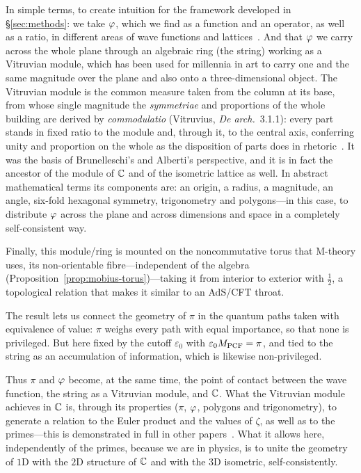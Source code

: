 In simple terms, to create intuition for the framework developed in \S\ref{sec:methods}: we take $\varphi$, which we find as a function and an operator, as well as a ratio, in different areas of wave functions and lattices~\cite{Pletser2018,Jagannathan2021,Jedrkiewicz2018,Sonnino2024}. And that $\varphi$ we carry across the whole plane through an algebraic ring (the string) working as a Vitruvian module, which has been used for millennia in art to carry one and the same magnitude over the plane and also onto a three-dimensional object. The Vitruvian module is the common measure taken from the column at its base, from whose single magnitude the \emph{symmetriae} and proportions of the whole building are derived by \emph{commodulatio} (Vitruvius, \emph{De arch.}~3.1.1): every part stands in fixed ratio to the module and, through it, to the central axis, conferring unity and proportion on the whole as the disposition of parts does in rhetoric~\cite{Santos2020}. It was the basis of Brunelleschi's and Alberti's perspective, and it is in fact the ancestor of the module of $\mathbb{C}$ and of the isometric lattice as well. In abstract mathematical terms its components are: an origin, a radius, a magnitude, an angle, six-fold hexagonal symmetry, trigonometry and polygons---in this case, to distribute $\varphi$ across the plane and across dimensions and space in a completely self-consistent way.

Finally, this module/ring is mounted on the noncommutative torus that M-theory uses, its non-orientable fibre---independent of the algebra (Proposition~\ref{prop:mobius-torus})---taking it from interior to exterior with $\tfrac12$, a topological relation that makes it similar to an AdS/CFT throat.

The result lets us connect the geometry of $\pi$ in the quantum paths taken with equivalence of value: $\pi$ weighs every path with equal importance, so that none is privileged. But here fixed by the cutoff $\varepsilon_0$ with $\varepsilon_0M_{\mathrm{PCF}}=\pi$, and tied to the string as an accumulation of information, which is likewise non-privileged.

Thus $\pi$ and $\varphi$ become, at the same time, the point of contact between the wave function, the string as a Vitruvian module, and $\mathbb{C}$. What the Vitruvian module achieves in $\mathbb{C}$ is, through its properties ($\pi$, $\varphi$, polygons and trigonometry), to generate a relation to the Euler product and the values of $\zeta$, as well as to the primes---this is demonstrated in full in other papers~\cite{Corr,F1}. What it allows here, independently of the primes, because we are in physics, is to unite the geometry of $1$D with the $2$D structure of $\mathbb{C}$ and with the $3$D isometric, self-consistently.

